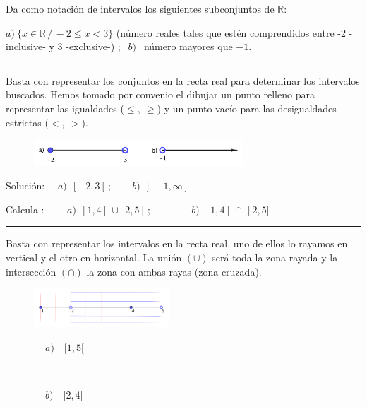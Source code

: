 \begin{miejercicio}

Da como notación de intervalos los siguientes subconjuntos de $\mathbb R$:

$a)\ \{ x\in \mathbb R \, / \, -2\leq x < 3 \} $ \footnotesize{(número reales tales que estén comprendidos entre -2 -inclusive- y 3 -exclusive-)} \normalsize{;} $\ \ b)\ \ $ número mayores que $-1$.

\vspace{3mm} \rule{250pt}{0.1pt}
\vspace{3mm}

Basta con representar los conjuntos en la recta real para determinar los intervalos buscados. Hemos tomado por convenio el dibujar un punto relleno para representar las igualdades ($\leq,\ \geq$) y un punto vacío para las desigualdades estrictas ($<,\ >$).

\begin{figure}[H]
			\centering
			\includegraphics[width=0.7\textwidth]{img-reales/reales10.png}
		\end{figure}
		
Solución: $\quad a)\ \ [-2,3[\, ; \qquad b)\ \ ]-1,\infty]$
\end{miejercicio}

\vspace{5mm}


\begin{miejercicio}

Calcula :  $\qquad a) \ \ [1,4] \, \cup \, ]2,5[\, ; \qquad \qquad b)\ \ [1,4] \, \cap \, ]2,5[	$

\vspace{3mm}
\rule{250pt}{0.1pt}
\vspace{3mm}

Basta con representar los intervalos en la recta real, uno de ellos lo rayamos en vertical y el otro en horizontal. La unión $(\cup)$ será toda la zona rayada y la intersección $(\cap)$
 la zona con ambas rayas (zona cruzada).
 
 \begin{multicols}{2}
\begin{figure}[H]
			\centering
			\includegraphics[width=0.45\textwidth]{img-reales/reales11.png}
		\end{figure} 	
		$\qquad \qquad a) \quad [1,5[$
		
		$\quad$
		
		$\qquad \qquad b) \quad ]2,4]$
 \end{multicols}

 
 \end{miejercicio}
	
